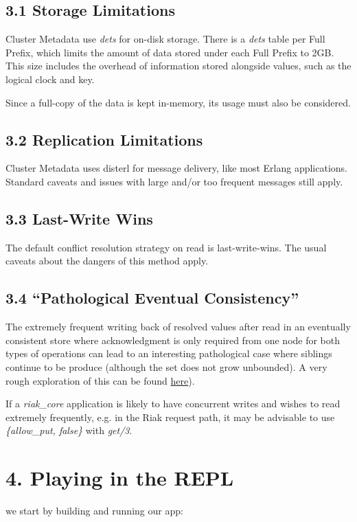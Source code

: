 \documentclass[letterpaper,10pt,english]{sphinxmanual}
\begin{document}
\subsection{3.1 Storage Limitations}
\label{riak_core_metadata:storage-limitations}
Cluster Metadata use \emph{dets} for on-disk storage. There is a \emph{dets}
table per Full Prefix, which limits the amount of data stored under
each Full Prefix to 2GB. This size includes the overhead of
information stored alongside values, such as the logical clock and
key.

Since a full-copy of the data is kept in-memory, its usage must also
be considered.


\subsection{3.2 Replication Limitations}
\label{riak_core_metadata:replication-limitations}
Cluster Metadata uses disterl for message delivery, like most Erlang
applications. Standard caveats and issues with large and/or too
frequent messages still apply.


\subsection{3.3 Last-Write Wins}
\label{riak_core_metadata:last-write-wins}
The default conflict resolution strategy on read is
last-write-wins. The usual caveats about the dangers of this method
apply.


\subsection{3.4 ``Pathological Eventual Consistency''}
\label{riak_core_metadata:pathological-eventual-consistency}
The extremely frequent writing back of resolved values after read in
an eventually consistent store where acknowledgment is only required
from one node for both types of operations can lead to an interesting
pathological case where siblings continue to be produce (although the
set does not grow unbounded). A very rough exploration of this can be
found \href{https://gist.github.com/jrwest/f8c0d49174f4db1c4c88}{here}).

If a \emph{riak\_core} application is likely to have concurrent writes and
wishes to read extremely frequently, e.g. in the Riak request path, it
may be advisable to use \emph{\{allow\_put, false\}} with \emph{get/3}.


\section{4. Playing in the REPL}
\label{riak_core_metadata:playing-in-the-repl}
we start by building and running our app:
\end{document}
